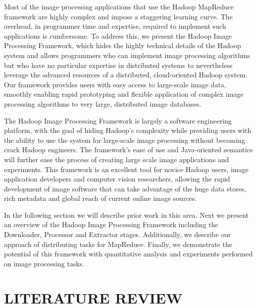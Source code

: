 \documentclass{osuthesis}
\begin{document}
				Most of the image processing applications that use the Hadoop
				MapReduce framework are highly complex and impose a staggering
				learning curve.  The overhead, in programmer time and expertise,
				required to implement such applications is cumbersome.  To address
				this, we present the Hadoop Image Processing Framework, which hides
				the highly technical details of the Hadoop system and allows
				programmers who can implement image processing algorithms but who have
				no particular expertise in distributed systems to nevertheless
				leverage the advanced resources of a distributed, cloud-oriented
				Hadoop system. Our framework provides users with easy access to
				large-scale image data, smoothly enabling rapid prototyping and
				flexible application of complex image processing algorithms to very
				large, distributed image databases.
				
				The Hadoop Image Processing Framework is largely a software
				engineering platform, with the goal of hiding Hadoop's complexity
				while providing users with the ability to use the system for
				large-scale image processing without becoming crack Hadoop engineers.
				The framework's ease of use and Java-oriented semantics will further
				ease the process of creating large scale image applications and
				experiments. This framework is an excellent tool for novice Hadoop
				users, image application developers and computer vision researchers,
				allowing the rapid development of image software that can take
				advantage of the huge data stores, rich metadata and global reach of
				current online image sources.%
				
				In the following section we will describe prior work in this
				area. Next we present an overview of the Hadoop Image Processing
				Framework including the Downloader, Processor and Extractor
				stages. Additionally, we describe our approach of distributing tasks
				for MapReduce. Finally, we demonstrate the potential of this framework
				with quantitative analysis and experiments performed on image
				processing tasks.
				\chapter{LITERATURE REVIEW}
\end{document}
